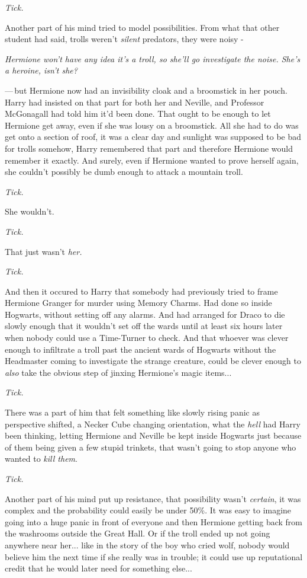 \emph{Tick.}

Another part of his mind tried to model possibilities. From what that other student had said, trolls weren't \emph{silent} predators, they were noisy -

\emph{Hermione won't have any idea it's a troll, so she'll go investigate the noise. She's a heroine, isn't she?}

---\,but Hermione now had an invisibility cloak and a broomstick in her pouch. Harry had insisted on that part for both her and Neville, and Professor McGonagall had told him it'd been done. That ought to be enough to let Hermione get away, even if she was lousy on a broomstick. All she had to do was get onto a section of roof, it was a clear day and sunlight was supposed to be bad for trolls somehow, Harry remembered that part and therefore Hermione would remember it exactly. And surely, even if Hermione wanted to prove herself again, she couldn't possibly be dumb enough to attack a mountain troll.

\emph{Tick.}

She wouldn't.

\emph{Tick.}

That just wasn't \emph{her.}

\emph{Tick.}

And then it occured to Harry that somebody had previously tried to frame Hermione Granger for murder using Memory Charms. Had done so inside Hogwarts, without setting off any alarms. And had arranged for Draco to die slowly enough that it wouldn't set off the wards until at least six hours later when nobody could use a Time-Turner to check. And that whoever was clever enough to infiltrate a troll past the ancient wards of Hogwarts without the Headmaster coming to investigate the strange creature, could be clever enough to \emph{also} take the obvious step of jinxing Hermione's magic items...

\emph{Tick.}

There was a part of him that felt something like slowly rising panic as perspective shifted, a Necker Cube changing orientation, what the \emph{hell} had Harry been thinking, letting Hermione and Neville be kept inside Hogwarts just because of them being given a few stupid trinkets, that wasn't going to stop anyone who wanted to \emph{kill them}.

\emph{Tick.}

Another part of his mind put up resistance, that possibility wasn't \emph{certain}, it was complex and the probability could easily be under 50\%. It was easy to imagine going into a huge panic in front of everyone and then Hermione getting back from the washrooms outside the Great Hall. Or if the troll ended up not going anywhere near her... like in the story of the boy who cried wolf, nobody would believe him the next time if she really was in trouble; it could use up reputational credit that he would later need for something else...

